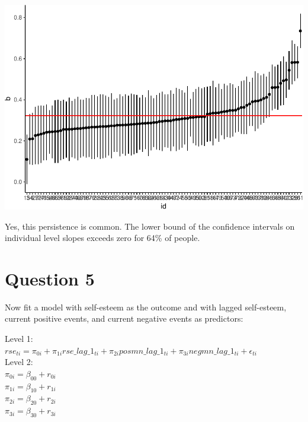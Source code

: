 \documentclass[]{article}
\newenvironment{Shaded}{\begin{snugshade}}{\end{snugshade}}
\newcommand{\KeywordTok}[1]{\textcolor[rgb]{0.13,0.29,0.53}{\textbf{#1}}}
\newcommand{\DataTypeTok}[1]{\textcolor[rgb]{0.13,0.29,0.53}{#1}}
\newcommand{\FloatTok}[1]{\textcolor[rgb]{0.00,0.00,0.81}{#1}}
\newcommand{\StringTok}[1]{\textcolor[rgb]{0.31,0.60,0.02}{#1}}
\newcommand{\OperatorTok}[1]{\textcolor[rgb]{0.81,0.36,0.00}{\textbf{#1}}}
\newcommand{\NormalTok}[1]{#1}
\begin{document}
\includegraphics{Beck_HW_7_files/figure-latex/unnamed-chunk-8-1.pdf}

\begin{Shaded}
\end{Shaded}

Yes, this persistence is common. The lower bound of the confidence
intervals on individual level slopes exceeds zero for 64\% of people.

\section{Question 5}\label{question-5}

Now fit a model with self-esteem as the outcome and with lagged
self-esteem, current positive events, and current negative events as
predictors:

Level 1:\\
\(rse_{ti} = \pi_{0i} + \pi_{1i}rse\_lag\_1_{ti} + \pi_{2i}posmn\_lag\_1_{ti} + \pi_{3i}negmn\_lag\_1_{ti} + \epsilon_{ti}\)\\
Level 2:\\
\(\pi_{0i} = \beta_{00} + r_{0i}\)\\
\(\pi_{1i} = \beta_{10} + r_{1i}\)\\
\(\pi_{2i} = \beta_{20} + r_{2i}\)\\
\(\pi_{3i} = \beta_{30} + r_{3i}\)
\end{document}
